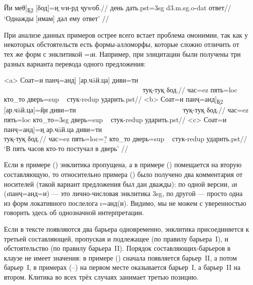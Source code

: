 \begingl
\gla {[}Йи меθ{]}\textsubscript{\b{Б2}} {[}δод{]}=\b{и} wи-рд ҷуwоб.//
 день дать.{\sc pst=3sg} {\sc d3.m.sg.o-dat} ответ//
\glft ‘Однажды [имам] дал ему ответ’ //
\endgl \xe

При анализе данных примеров острее всего встает проблема омонимии, так как у некоторых обстоятельств есть формы-алломорфы, которые сложно отличить от тех же форм с энклитикой =\i{и}. Например, при элицитации были получены три разных варианта перевода одного предложения:

\a<a> \begingl
\gla {[}Соат=и панҷ=анд{]} {[}ар.чāй.ца{]} диви=ти ~~~~~~~~~~~~~~~~~~~~~~~~~~~~~~~~~~~~~~~~ туқ-туқ δод.//
\glc час={\sc ez} пять={\sc loc} кто\_то дверь={\sc sup} ~ стук-{\sc redup} ударить.{\sc pst}//
\endgl
\a<b> \begingl
\gla {[}Соат=и панҷ=анд{]}\textsubscript{\b{Б2}} {[}ар.чāй.ца{]}=\b{йи} диви=ти ~~~~~~~~~~~~~~~~~~~~~~~~~~~~~~ туқ-туқ δод.//
\glc час={\sc ez} пять={\sc loc} кто\_то={\sc 3sg} дверь={\sc sup} ~ стук-{\sc redup} ударить.{\sc pst}//
\endgl
\a<c> \begingl
\gla {[}Соат=и панҷ=анд{]}=\b{и} ар.чāй.ца диви=ти ~~~~~~~~~~~~~~~~~~~~~~~~~~~~~~~~~~~~~~~~~ туқ-туқ δод.//
\glc час={\sc ez} пять={\sc loc}=\b{?} кто\_то дверь={\sc sup} ~ стук-{\sc redup} ударить.{\sc pst}//
\glft ‘В пять часов кто-то постучал в дверь’ \trailingcitation{[элицитация, 2019]}//
\endgl \xe

Если в примере () энклитика пропущена, а в примере () помещается на вторую составляющую, то относительно примера () было получено два комментария от носителей (такой вариант предложения был дан дважды): по одной версии, \i{и} (\i{панҷ=анд=и}) — это лично-числовая энклитика {\sc 3sg}, по другой — просто одна из форм локативного послелога \i{=анд(и)}. Видимо, мы не можем с уверенностью говорить здесь об однозначной интерпретации.

Если в тексте появляются два барьера одновременно, энклитика присоединяется к третьей составляющей, пропуская и подлежащее (по правилу барьера~I), и обстоятельство (по правилу барьера~II). Порядок составляющих-барьеров в клаузе не имеет значения: в примере () сначала появляется барьер~II, а потом барьер~I, в примерах (–) на первом месте оказывается барьер~I, а барьер~II на втором. Клитика во всех трёх случаях занимает третью позицию.

